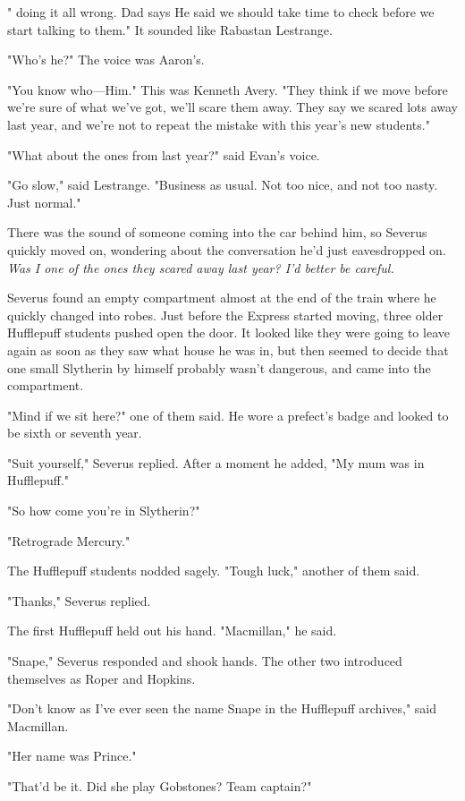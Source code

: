 "{\el} doing it all wrong. Dad says He said we should take time to check before we start talking to them." It sounded like Rabastan Lestrange.

"Who's he?" The voice was Aaron's.

"You know who—Him." This was Kenneth Avery. "They think if we move before we're sure of what we've got, we'll scare them away. They say we scared lots away last year, and we're not to repeat the mistake with this year's new students."

"What about the ones from last year?" said Evan's voice.

"Go slow," said Lestrange. "Business as usual. Not too nice, and not too nasty. Just normal."

There was the sound of someone coming into the car behind him, so Severus quickly moved on, wondering about the conversation he'd just eavesdropped on. \emph{Was I one of the ones they scared away last year? I'd better be careful.}

Severus found an empty compartment almost at the end of the train where he quickly changed into robes. Just before the Express started moving, three older Hufflepuff students pushed open the door. It looked like they were going to leave again as soon as they saw what house he was in, but then seemed to decide that one small Slytherin by himself probably wasn't dangerous, and came into the compartment.

"Mind if we sit here?" one of them said. He wore a prefect's badge and looked to be sixth or seventh year.

"Suit yourself," Severus replied. After a moment he added, "My mum was in Hufflepuff."

"So how come you're in Slytherin?"

"Retrograde Mercury."

The Hufflepuff students nodded sagely. "Tough luck," another of them said.

"Thanks," Severus replied.

The first Hufflepuff held out his hand. "Macmillan," he said.

"Snape," Severus responded and shook hands. The other two introduced themselves as Roper and Hopkins.

"Don't know as I've ever seen the name Snape in the Hufflepuff archives," said Macmillan.

"Her name was Prince."

"That'd be it. Did she play Gobstones? Team captain?"

